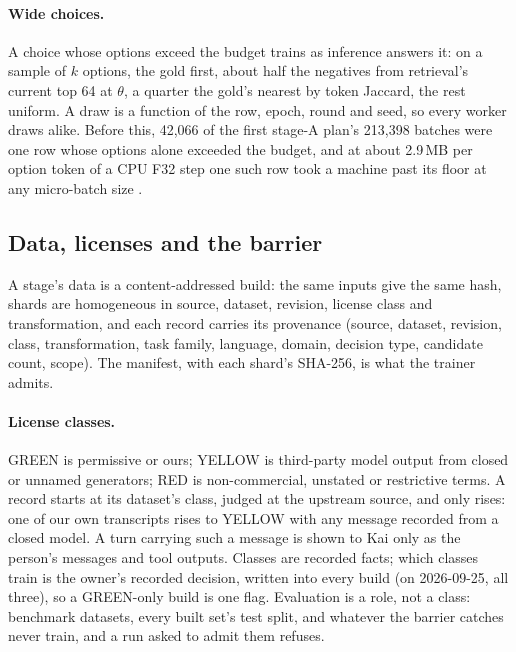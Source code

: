 \paragraph{Wide choices.}
A choice whose options exceed the budget trains as inference answers it: on a
sample of $k$ options, the gold first, about half the negatives from
retrieval's current top 64 at $\theta$, a quarter the gold's nearest by token
Jaccard, the rest uniform. A draw is a function of the row, epoch, round and
seed, so every worker draws alike. Before this, 42{,}066 of the first stage-A
plan's 213{,}398 batches were one row whose options alone exceeded the budget,
and at about 2.9\,MB per option token of a CPU F32 step one such row took a
machine past its floor at any micro-batch size \meas.

\subsection{Data, licenses and the barrier}
\label{sec:barrier}

A stage's data is a content-addressed build: the same inputs give the same
hash, shards are homogeneous in source, dataset, revision, license class and
transformation, and each record carries its provenance (source, dataset,
revision, class, transformation, task family, language, domain, decision type,
candidate count, scope). The manifest, with each shard's SHA-256, is what the
trainer admits.

\paragraph{License classes.}
GREEN is permissive or ours; YELLOW is third-party model output from closed or
unnamed generators; RED is non-commercial, unstated or restrictive terms. A
record starts at its dataset's class, judged at the upstream source, and only
rises: one of our own transcripts rises to YELLOW with any message recorded from
a closed model. A turn carrying such a message is shown to Kai only as the
person's messages and tool outputs. Classes are recorded facts; which classes
train is the owner's recorded decision, written into every build (on
2026-09-25, all three), so a GREEN-only build is one flag. Evaluation is a role,
not a class: benchmark datasets, every built set's test split, and whatever the
barrier catches never train, and a run asked to admit them refuses.

